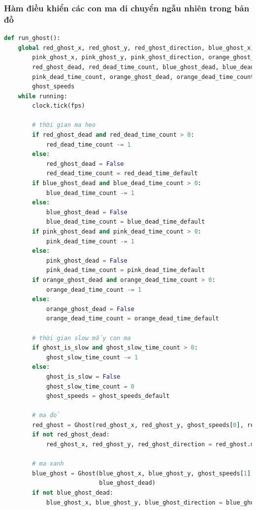 \documentclass[a4paper]{article}
\begin{document}
\subsubsection{Hàm điều khiển các con ma di chuyển ngẫu nhiên trong bản đồ}
\begin{lstlisting}[language=Python]
def run_ghost():
    global red_ghost_x, red_ghost_y, red_ghost_direction, blue_ghost_x, blue_ghost_y, blue_ghost_direction, \
        pink_ghost_x, pink_ghost_y, pink_ghost_direction, orange_ghost_x, orange_ghost_y, orange_ghost_direction, \
        red_ghost_dead, red_dead_time_count, blue_ghost_dead, blue_dead_time_count, pink_ghost_dead, \
        pink_dead_time_count, orange_ghost_dead, orange_dead_time_count, ghost_is_slow, ghost_slow_time_count, \
        ghost_speeds
    while running:
        clock.tick(fps)

        # thời gian ma hẹo
        if red_ghost_dead and red_dead_time_count > 0:
            red_dead_time_count -= 1
        else:
            red_ghost_dead = False
            red_dead_time_count = red_dead_time_default
        if blue_ghost_dead and blue_dead_time_count > 0:
            blue_dead_time_count -= 1
        else:
            blue_ghost_dead = False
            blue_dead_time_count = blue_dead_time_default
        if pink_ghost_dead and pink_dead_time_count > 0:
            pink_dead_time_count -= 1
        else:
            pink_ghost_dead = False
            pink_dead_time_count = pink_dead_time_default
        if orange_ghost_dead and orange_dead_time_count > 0:
            orange_dead_time_count -= 1
        else:
            orange_ghost_dead = False
            orange_dead_time_count = orange_dead_time_default

        # thời gian slow mấy con ma
        if ghost_is_slow and ghost_slow_time_count > 0:
            ghost_slow_time_count -= 1
        else:
            ghost_is_slow = False
            ghost_slow_time_count = 0
            ghost_speeds = ghost_speeds_default

        # ma đỏ
        red_ghost = Ghost(red_ghost_x, red_ghost_y, ghost_speeds[0], red_ghost_direction, red_ghost_dead)
        if not red_ghost_dead:
            red_ghost_x, red_ghost_y, red_ghost_direction = red_ghost.move()

        # ma xanh
        blue_ghost = Ghost(blue_ghost_x, blue_ghost_y, ghost_speeds[1], blue_ghost_direction,
                           blue_ghost_dead)
        if not blue_ghost_dead:
            blue_ghost_x, blue_ghost_y, blue_ghost_direction = blue_ghost.move()


\end{lstlisting}
\end{document}
